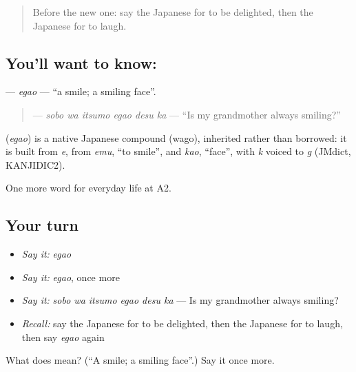 \label{lesson:JA-C245-egao}



\begin{quote}
Before the new one: say the Japanese for to be delighted, then the Japanese for to laugh.
\end{quote}

\subsection*{You'll want to know: }
\textbf{} — \emph{egao} — \textquotedblleft{}a smile; a smiling face\textquotedblright{}.

\begin{quote}
\textbf{  } — \emph{sobo wa itsumo egao desu ka} — \textquotedblleft{}Is my grandmother always smiling?\textquotedblright{}
\end{quote}

\begin{cousinweb}
\textbf{} (\emph{egao}) is a native Japanese compound (wago), inherited rather than borrowed: it is built from \emph{e}, from \emph{emu}, \textquotedblleft{}to smile\textquotedblright{}, and \emph{kao}, \textquotedblleft{}face\textquotedblright{}, with \emph{k} voiced to \emph{g} (JMdict, KANJIDIC2).
\end{cousinweb}

\begin{grammarlens}[title={What you've built}]
One more word for everyday life at A2.
\end{grammarlens}

\subsection*{Your turn}
\begin{itemize}
\raggedright
  \item \emph{Say it:} \emph{egao}
  \item \emph{Say it:} \emph{egao}, once more
  \item \emph{Say it:} \emph{sobo wa itsumo egao desu ka} — Is my grandmother always smiling?
  \item \emph{Recall:} say the Japanese for to be delighted, then the Japanese for to laugh, then say \emph{egao} again
\end{itemize}

\begin{tcolorbox}[breakable,colback=teal!4,colframe=teal!35!black,title={Before you move on}]
What does  mean? (\textquotedblleft{}A smile; a smiling face\textquotedblright{}.) Say it once more.
\end{tcolorbox}
